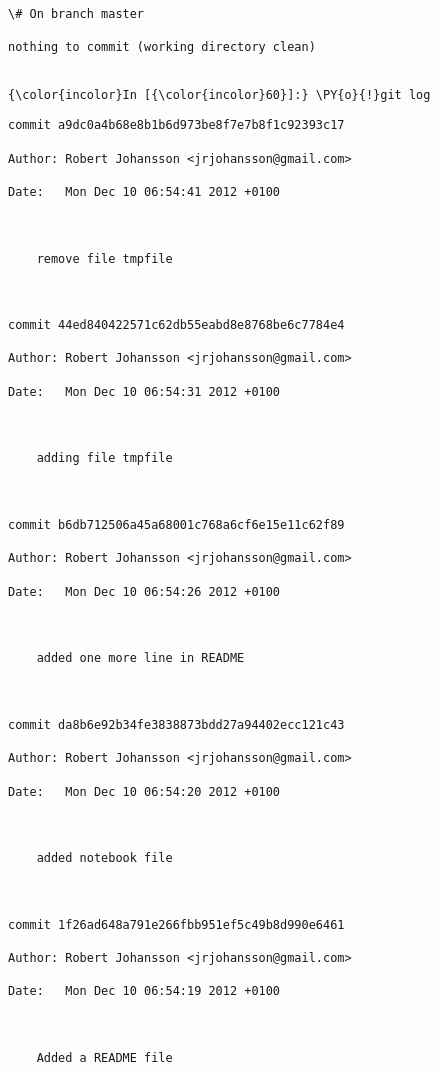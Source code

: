     \begin{Verbatim}[commandchars=\\\{\}]
\# On branch master

nothing to commit (working directory clean)


    \end{Verbatim}





    \begin{Verbatim}[commandchars=\\\{\}]
{\color{incolor}In [{\color{incolor}60}]:} \PY{o}{!}git log
\end{Verbatim}

    \begin{Verbatim}[commandchars=\\\{\}]
commit a9dc0a4b68e8b1b6d973be8f7e7b8f1c92393c17

Author: Robert Johansson <jrjohansson@gmail.com>

Date:   Mon Dec 10 06:54:41 2012 +0100



    remove file tmpfile



commit 44ed840422571c62db55eabd8e8768be6c7784e4

Author: Robert Johansson <jrjohansson@gmail.com>

Date:   Mon Dec 10 06:54:31 2012 +0100



    adding file tmpfile



commit b6db712506a45a68001c768a6cf6e15e11c62f89

Author: Robert Johansson <jrjohansson@gmail.com>

Date:   Mon Dec 10 06:54:26 2012 +0100



    added one more line in README



commit da8b6e92b34fe3838873bdd27a94402ecc121c43

Author: Robert Johansson <jrjohansson@gmail.com>

Date:   Mon Dec 10 06:54:20 2012 +0100



    added notebook file



commit 1f26ad648a791e266fbb951ef5c49b8d990e6461

Author: Robert Johansson <jrjohansson@gmail.com>

Date:   Mon Dec 10 06:54:19 2012 +0100



    Added a README file


    \end{Verbatim}


